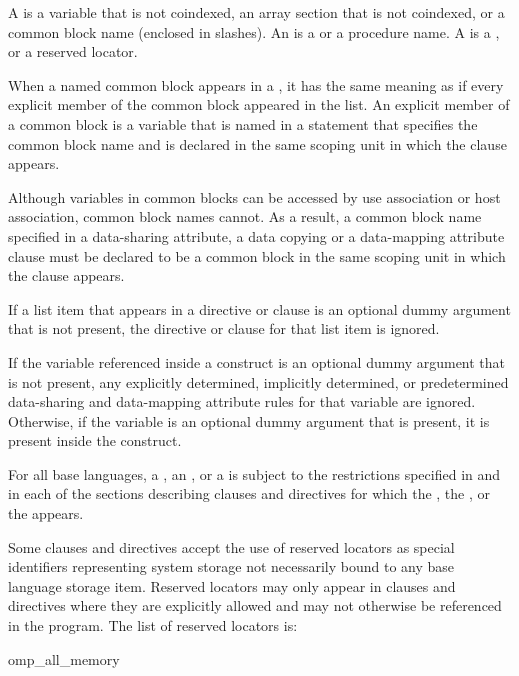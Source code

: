 \begin{fortranspecific}
A  is a variable that is not coindexed, an array section that
is not coindexed, or a common block name (enclosed in slashes).  An
 is a  or a procedure name. A
 is a , or a reserved locator.

When a named common block appears in a , it has the same
meaning as if every explicit member of the common block appeared in
the list.  An explicit member of a common block is a variable that is
named in a  statement that specifies the common block
name and is declared in the same scoping unit in which the clause
appears.

Although variables in common blocks can be accessed by use association
or host association, common block names cannot.  As a result, a common
block name specified in a data-sharing attribute, a data copying or
a data-mapping attribute clause must be declared to be a common block in
the same scoping unit in which the clause appears.

If a list item that appears in a directive or clause is an optional
dummy argument that is not present, the directive or clause for that
list item is ignored.

If the variable referenced inside a construct is an optional dummy
argument that is not present, any explicitly determined, implicitly
determined, or predetermined data-sharing and data-mapping attribute
rules for that variable are ignored.  Otherwise, if the variable is an
optional dummy argument that is present, it is present inside the
construct.
\end{fortranspecific}

For all base languages, a , an , or
a  is subject to the restrictions specified in 
 and in each of the sections describing clauses 
and directives for which the , the , or the
 appears.

Some clauses and directives accept the use of reserved locators as special
identifiers representing system storage not necessarily bound to any base
language storage item. Reserved locators may only appear in clauses and
directives where they are explicitly allowed and may not otherwise be
referenced in the program. The list of reserved locators is:

\begin{indentedcodelist}
omp_all_memory
\end{indentedcodelist}

